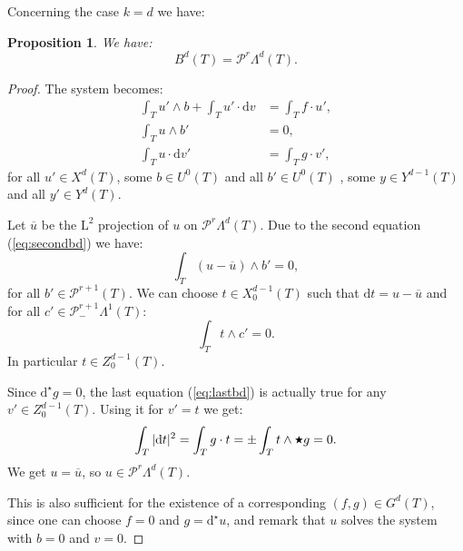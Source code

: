 \documentclass[10pt,a4paper]{article}
\newcommand{\rmd}{\mathrm{d}}
\newcommand{\rmL}{\mathrm{L}}
\newcommand{\calP}{\mathcal{P}}
\newcommand{\hs}{\raisebox{1pt}{$\scriptstyle \bigstar$}}
\newcommand{\Poly}{\calP}
\newcommand{\Pminus}{\Poly_{\!\!-}}
\newtheorem{proposition}[theorem]{Proposition}
\theoremstyle{remark}
\theoremstyle{definition}
\numberwithin{equation}{section}
\begin{document}
Concerning the case $k = d$ we have:
\begin{proposition}
  We have:
  \begin{equation}
    B^d(T) = \Poly^r\Lambda^d(T).
  \end{equation}
\end{proposition}
\begin{proof}
The system becomes:
 \begin{align}
   \int_T u' \wedge b + \int_T u' \cdot \rmd v & = \int_T f \cdot u', \label{eq:firstbd}\\
  \int_T u \wedge b' & = 0 , \label{eq:secondbd}\\
  \int_T u \cdot \rmd v' & = \int_T g \cdot v', \label{eq:lastbd}
\end{align} 
 for all $u' \in X^d(T)$, some $b \in U^0(T)$ and all $b' \in U^{0}(T)$ , some $y \in Y^{d-1}(T)$ and all $y' \in Y^{d}(T)$.



 Let $\overline u$ be the $\rmL^2$ projection of $u$ on $\Poly^r\Lambda^d(T)$. Due to the second equation (\ref{eq:secondbd}) we have:
 \begin{equation}
   \int_T (u - \overline u) \wedge b' = 0,
 \end{equation}
 for all $b' \in \Poly^{r+1}(T)$. We can choose $t \in X^{d-1}_0(T)$ such that $\rmd t = u- \overline u$ and for all $c' \in \Pminus^{r+1} \Lambda^1(T)$:
 \begin{equation}
   \int_T t \wedge c' =0.
 \end{equation}
 In particular $t \in Z^{d-1}_0(T)$.
 
 
 Since $\rmd^\star g = 0$, the last equation (\ref{eq:lastbd}) is actually true for any $v' \in Z^{d-1}_0(T)$.  Using it for $v' = t$ we get:
 \begin{equation}
   \int_T | \rmd t|^2 = \int_T g \cdot t = \pm \int_T t \wedge \hs g = 0.
 \end{equation}
 We get $u = \overline u$, so $u \in \Poly^r\Lambda^d(T)$.

 This is also sufficient for the existence of a corresponding $(f,g) \in G^d(T)$, since one can choose $f= 0$ and $g = \rmd^\star u$, and remark that $u$ solves the system with $b= 0$ and $v = 0$.
\end{proof}
\end{document}
